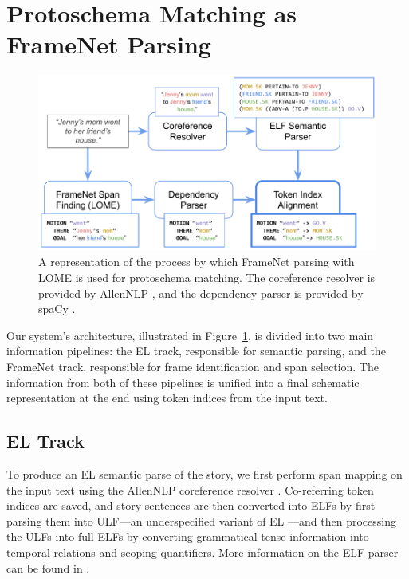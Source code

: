 \section{Protoschema Matching as FrameNet Parsing}
\label{sec:lome}

\begin{figure}
    \centering
    \includegraphics[width=\columnwidth]{figures/nesl/lome_architecture}
    \caption{A representation of the process by which FrameNet parsing with LOME is used for protoschema matching. The coreference resolver is provided by AllenNLP \citep{Gardner2017AllenNLP}, and the dependency parser is provided by spaCy \citep{spacy2}.}
    \label{fig:lome_architecture}
\end{figure}

Our system's architecture, illustrated in Figure~\ref{fig:lome_architecture}, is divided into two main information pipelines: the EL track, responsible for semantic parsing, and the FrameNet track, responsible for frame identification and span selection. The information from both of these pipelines is unified into a final schematic representation at the end using token indices from the input text.

\subsection{EL Track}
To produce an EL semantic parse of the story, we first perform span mapping on the input text using the AllenNLP coreference resolver \citep{Gardner2017AllenNLP}. Co-referring token indices are saved, and story sentences are then converted into ELFs by first parsing them into ULF---an underspecified variant of EL \citep{kim2019IWCS}---and then processing the ULFs into full ELFs by converting grammatical tense information into temporal relations and scoping quantifiers. More information on the ELF parser can be found in \citep{Lawley2021LearningGE}.

